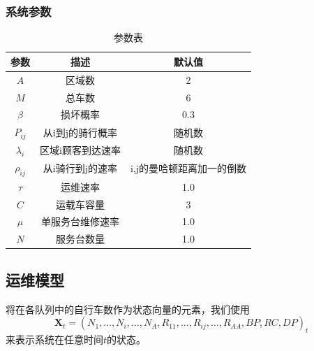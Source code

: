 \documentclass{article}
\begin{document}
\subsubsection{系统参数}
\begin{table}[H]
    \centering
    \caption{参数表}
    \begin{tabular}{ |c|c|c| } 
     \hline
     参数 & 描述 & 默认值 \\ 
     \hline
     $A$ & 区域数 & 2 \\ 
     \hline
     $M$ & 总车数 & 6 \\ 
     \hline
     $\beta$ & 损坏概率 & 0.3 \\
     \hline
     $P_{ij}$ & 从i到j的骑行概率 & 随机数 \\
     \hline
     $\lambda_i$ & 区域i顾客到达速率 & 随机数 \\
     \hline
     $\rho_{ij}$ & 从i骑行到j的速率 & i,j的曼哈顿距离加一的倒数 \\
     \hline
     $\tau$ & 运维速率 & 1.0 \\
     \hline
     $C$ & 运载车容量 & 3 \\
     \hline
     $\mu$ & 单服务台维修速率 & 1.0 \\
     \hline
     $N$ & 服务台数量 & 1.0 \\
     \hline
    \end{tabular}
    \label{paratable}
\end{table}

\subsection{运维模型}
将在各队列中的自行车数作为状态向量的元素，我们使用$$\boldsymbol{X}_t = (N_1, \dots, N_{i}, \dots, N_A, R_{11}, \dots, R_{ij}, \dots, R_{AA}, BP, RC, DP)_t$$ 来表示系统在任意时间$t$的状态。
\end{document}
